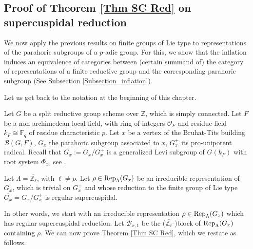         
		
		
		
		
		
		
		
    \subsection{Proof of Theorem \ref{Thm SC Red} on supercuspidal reduction}
		
		We now apply the previous results on finite groups of Lie type to representations of the parahoric subgroups of a $p$-adic group. For this, we show that the inflation induces an equivalence of categories between (certain summand of) the category of representations of a finite reductive group and the corresponding parahoric subgroup (See Subsection \ref{Subsection_inflation}). 
		
		Let us get back to the notation at the beginning of this chapter.
		
		Let $G$ be a split reductive group scheme over $\mathbb{Z}$, which is simply connected. Let $F$ be a non-archimedean local field, with ring of integers $\mathcal{O}_F$ and residue field $k_F \cong \mathbb{F}_q$ of residue characteristic $p$. Let $x$ be a vertex of the Bruhat-Tits building $\mathcal{B}(G, F)$, $G_x$ the parahoric subgroup associated to $x$, $G_x^+$ its pro-unipotent radical. Recall that $\overline{G_x}:=G_x/G_x^+$ is a generalized Levi subgroup of $G(k_F)$ with root system $\Phi_x$, see \cite[Theorem 3.17]{rabinoff2003bruhat}.
		
		Let $\Lambda=\overline{\mathbb{Z}_\ell}$, with $\ell \neq p$. Let $\rho \in \operatorname{\operatorname{Rep}}_{\Lambda}(G_x)$ be an irreducible representation of $G_x$, which is trivial on $G_x^+$ and whose reduction to the finite group of Lie type $\overline{G_x}=G_x/G_x^+$ is regular supercuspidal. 
		
		
		In other words, we start with an irreducible representation $\rho \in \operatorname{\operatorname{Rep}}_{\Lambda}(G_x)$ which has regular supercuspidal reduction. Let $\mathcal{B}_{x,1}$ be the ($\overline{\mathbb{Z}_{\ell}}$-)block of $\operatorname{\operatorname{Rep}}_{\Lambda}(G_x)$ containing $\rho$. We can now prove Theorem \ref{Thm SC Red}, which we restate as follows.
		
